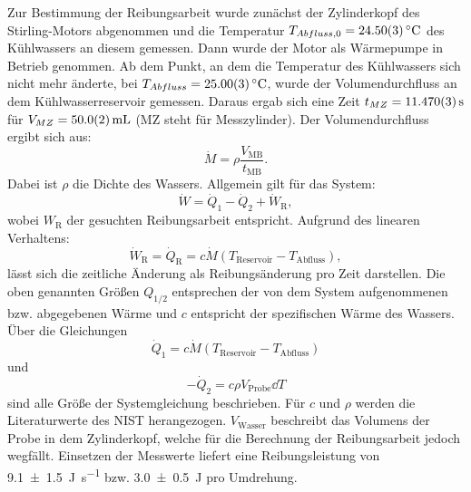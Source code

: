	Zur Bestimmung der Reibungsarbeit wurde zunächst der Zylinderkopf des Stirling-Motors abgenommen und die Temperatur $T_{Abfluss,0} = \SI{24,5+-0,03}{\celsius}$ des Kühlwassers an diesem gemessen.
	Dann  wurde der Motor als Wärmepumpe in Betrieb genommen.
	Ab dem Punkt, an dem die Temperatur des Kühlwassers sich nicht mehr änderte, bei $T_{Abfluss} = \SI{25,0+-0,03}{\celsius}$, wurde der Volumendurchfluss an dem Kühlwasserreservoir gemessen.
	Daraus ergab sich eine Zeit $t_{MZ} = \SI{11,47+-0,003}{\second}$ für $V_{MZ} = \SI{50+-0,2}{\milli\liter}$ (MZ steht für Messzylinder).	
	Der Volumendurchfluss ergibt sich aus:
	\begin{equation} %
		\dot{M} = \rho \frac{V_\text{MB}}{t_\text{MB}}.
	\end{equation} %
	Dabei ist $\rho$ die Dichte des Wassers.
	Allgemein gilt für das System:
	\begin{equation} \label{eq:W}%
		\dot{W} = \dot{Q}_1 - \dot{Q}_2 + \dot{W}_\text{R},
	\end{equation} %
	wobei $W_\text{R}$ der gesuchten Reibungsarbeit entspricht.
	Aufgrund des linearen Verhaltens:
	\begin{equation} %
		\dot{W}_\text{R} = \dot{Q}_\text{R} = c \dot{M} (T_\text{Reservoir} - T_\text{Abfluss}),
	\end{equation} %
	lässt sich die zeitliche Änderung als Reibungsänderung pro Zeit darstellen.
	Die oben genannten Größen $Q_{1/2}$ entsprechen der von dem System aufgenommenen bzw. abgegebenen Wärme und $c$ entspricht der spezifischen Wärme des Wassers.
	Über die Gleichungen
	\begin{equation} %
		\dot{Q}_1 = c \dot{M} (T_\text{Reservoir} - T_\text{Abfluss})
	\end{equation} %
	und
	\begin{equation} \label{eq:Q2} %
		-\dot{Q}_2 = c \rho V_\text{Probe} \dd{T}
	\end{equation} %
	sind alle Größe der Systemgleichung beschrieben.
	Für $c$ und $\rho$ werden die Literaturwerte des NIST\cite{NISTwater} herangezogen.
	$V_\text{Wasser}$ beschreibt das Volumens der Probe in dem Zylinderkopf, welche für die Berechnung der Reibungsarbeit jedoch wegfällt.
	Einsetzen der Messwerte liefert eine Reibungsleistung von \SI{9.1+-1.5}{\joule\per\second} bzw. \SI{3.0+-0.5}{\joule} pro Umdrehung.	
	

